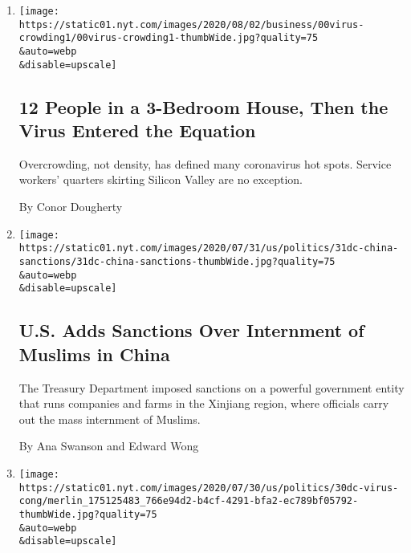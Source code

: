 \begin{enumerate}
\def\labelenumi{\arabic{enumi}.}
\item
  \href{/2020/08/01/business/economy/housing-overcrowding-coronavirus.html}{}

  \texttt{[image: https://static01.nyt.com/images/2020/08/02/business/00virus-crowding1/00virus-crowding1-thumbWide.jpg?quality=75\\\&auto=webp\\\&disable=upscale]}

  \hypertarget{12-people-in-a-3-bedroom-house-then-the-virus-entered-the-equation}{%
  \subsection{12 People in a 3-Bedroom House, Then the Virus Entered the
  Equation}\label{12-people-in-a-3-bedroom-house-then-the-virus-entered-the-equation}}

  Overcrowding, not density, has defined many coronavirus hot spots.
  Service workers' quarters skirting Silicon Valley are no exception.

  By Conor Dougherty
\item
  \href{/2020/07/31/us/politics/sanctions-china-xinjiang-uighurs.html}{}

  \texttt{[image: https://static01.nyt.com/images/2020/07/31/us/politics/31dc-china-sanctions/31dc-china-sanctions-thumbWide.jpg?quality=75\\\&auto=webp\\\&disable=upscale]}

  \hypertarget{us-adds-sanctions-over-internment-of-muslims-in-china}{%
  \subsection{U.S. Adds Sanctions Over Internment of Muslims in
  China}\label{us-adds-sanctions-over-internment-of-muslims-in-china}}

  The Treasury Department imposed sanctions on a powerful government
  entity that runs companies and farms in the Xinjiang region, where
  officials carry out the mass internment of Muslims.

  By Ana Swanson and Edward Wong
\item
  \href{/2020/07/30/us/politics/senate-virus-aid.html}{}

  \texttt{[image: https://static01.nyt.com/images/2020/07/30/us/politics/30dc-virus-cong/merlin\_175125483\_766e94d2-b4cf-4291-bfa2-ec789bf05792-thumbWide.jpg?quality=75\\\&auto=webp\\\&disable=upscale]}

  \hypertarget{with-jobless-aid-set-to-lapse-lawmakers-fail-to-agree-on-extension}{%
}
\end{enumerate}
